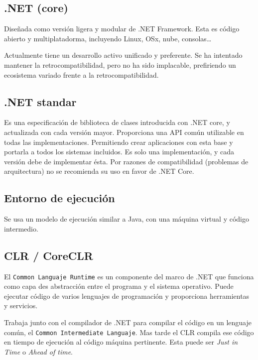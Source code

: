 \subsection{.NET (core)}
    Diseñada como versión ligera y modular de .NET Framework. Esta es código abierto y multiplatadorma, incluyendo Linux, OSx, nube, consolas\dots

    Actualmente tiene un desarrollo activo unificado y preferente. Se ha intentado mantener la retrocompatibilidad, pero no ha sido implacable, prefiriendo un ecosistema variado frente a la retrocompatibilidad.

\subsection{.NET standar}
    Es una especificación de biblioteca de clases introducida con .NET core, y actualizada con cada versión mayor. Proporciona una API común utilizable en todas las implementaciones. Permitiendo crear aplicaciones con esta base y portarla a todos los sistemas incluidos. Es solo una implementación, y cada versión debe de implementar ésta. Por razones de compatibilidad (problemas de arquitectura) no se recomienda su uso en favor de .NET Core.


\subsection{Entorno de ejecución}
    Se usa un modelo de ejecución similar a Java, con una máquina virtual y código intermedio.

    \subsection{CLR / CoreCLR}
        El \texttt{Common Languaje Runtime} es un componente del marco de .NET que funciona como capa des abstracción entre el programa y el sistema operativo. Puede ejecutar código de varios lenguajes de programación y proporciona herramientas y servicios.

        Trabaja junto con el compilador de .NET para compilar el código en un lenguaje común, el \texttt{Common Intermediate Languaje}. Mas tarde el CLR compila ese código en tiempo de ejecución al código máquina pertinente. Esta puede ser \textit{Just in Time} o \textit{Ahead of time}.
        
